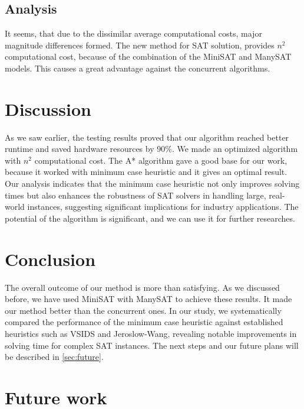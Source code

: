 \documentclass{article}
\begin{document}
\subsection{Analysis}
It seems, that due to the dissimilar average computational costs, major magnitude differences formed. The new method for SAT solution, provides $n^{2}$ computational cost, because of the combination of the MiniSAT and ManySAT models. This causes a great advantage against the concurrent algorithms.

\section{Discussion}
\label{sec:discussion}

As we saw earlier, the testing results proved that our algorithm reached better runtime and saved hardware resources by 90\%. We made an optimized algorithm with $n^2$ computational cost. The A* algorithm gave a good base for our work, because it worked with minimum case heuristic and it gives an optimal result. Our analysis indicates that the minimum case heuristic not only improves solving times but also enhances the robustness of SAT solvers in handling large, real-world instances, suggesting significant implications for industry applications. The potential of the algorithm is significant, and we can use it for further researches.

\section{Conclusion}
\label{sec:conclusion}

The overall outcome of our method is more than satisfying.  As we discussed before, we have used MiniSAT with ManySAT to achieve these results. It made our method better than the concurrent ones. In our study, we systematically compared the performance of the minimum case heuristic against established heuristics such as VSIDS and Jeroslow-Wang, revealing notable improvements in solving time for complex SAT instances. The next steps and our future plans will be described in \autoref{sec:future}.

\section{Future work}
\label{sec:future}
\end{document}
